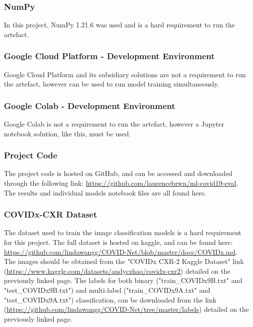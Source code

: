 \subsubsection{NumPy}
In this project, NumPy 1.21.6 was used and is a hard requirement to run the artefact.

\subsubsection{Google Cloud Platform - Development Environment}
Google Cloud Platform and its subsidiary solutions are not a requirement to run the artefact, however can be used to run model training simultaneously.

\subsubsection{Google Colab - Development Environment}
Google Colab is not a requirement to run the artefact, however a Jupyter notebook solution, like this, must be used.

\subsubsection{Project Code}
The project code is hosted on GitHub, and can be accessed and downloaded through the following link: \url{https://github.com/laurencebrwn/ml-covid19-eval}. The results and individual models notebook files are all found here.

\subsubsection{COVIDx-CXR Dataset}
The dataset used to train the image classification models is a hard requirement for this project. The full dataset is hosted on kaggle, and can be found here: \url{https://github.com/lindawangg/COVID-Net/blob/master/docs/COVIDx.md}. The images should be obtained from the "COVIDx CXR-2 Kaggle Dataset" link (\url{https://www.kaggle.com/datasets/andyczhao/covidx-cxr2}) detailed on the previously linked page. The labels for both binary ("train\_COVIDx9B.txt" and "test\_COVIDx9B.txt") and multi-label ("train\_COVIDx9A.txt" and "test\_COVIDx9A.txt") classification, can be downloaded from the link (\url{https://github.com/lindawangg/COVID-Net/tree/master/labels}) detailed on the previously linked page.

